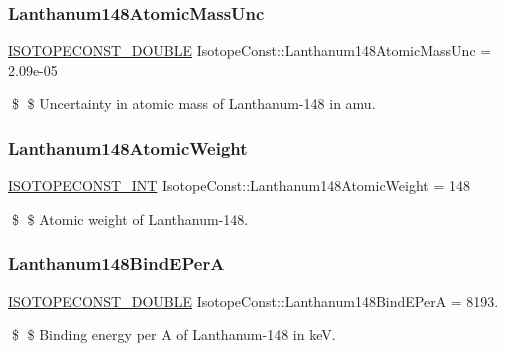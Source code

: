 \subsubsection{\texorpdfstring{Lanthanum148\+Atomic\+Mass\+Unc}{Lanthanum148AtomicMassUnc}}
{\footnotesize\ttfamily \mbox{\hyperlink{group___isotope_const-_macros_ga8f45a7272ce02c0b4c65c44636ed719a}{I\+S\+O\+T\+O\+P\+E\+C\+O\+N\+S\+T\+\_\+\+D\+O\+U\+B\+LE}} Isotope\+Const\+::\+Lanthanum148\+Atomic\+Mass\+Unc = 2.\+09e-\/05}

\$ \$ Uncertainty in atomic mass of Lanthanum-\/148 in amu. \mbox{\label{group___isotope_const-_lanthanum-_la148_ga813e64580b08be4a4ba6d1d8aec3b73d}} 
\subsubsection{\texorpdfstring{Lanthanum148\+Atomic\+Weight}{Lanthanum148AtomicWeight}}
{\footnotesize\ttfamily \mbox{\hyperlink{group___isotope_const-_macros_ga5f18360b3e99483a35c32d789e62621c}{I\+S\+O\+T\+O\+P\+E\+C\+O\+N\+S\+T\+\_\+\+I\+NT}} Isotope\+Const\+::\+Lanthanum148\+Atomic\+Weight = 148}

\$ \$ Atomic weight of Lanthanum-\/148. \mbox{\label{group___isotope_const-_lanthanum-_la148_gab303f054431a8c32c63f674e652cbbca}} 
\subsubsection{\texorpdfstring{Lanthanum148\+Bind\+E\+PerA}{Lanthanum148BindEPerA}}
{\footnotesize\ttfamily \mbox{\hyperlink{group___isotope_const-_macros_ga8f45a7272ce02c0b4c65c44636ed719a}{I\+S\+O\+T\+O\+P\+E\+C\+O\+N\+S\+T\+\_\+\+D\+O\+U\+B\+LE}} Isotope\+Const\+::\+Lanthanum148\+Bind\+E\+PerA = 8193.}

\$ \$ Binding energy per A of Lanthanum-\/148 in keV. \mbox{\label{group___isotope_const-_lanthanum-_la148_ga73ab59455846488c670b7d380523b6e9}} 
